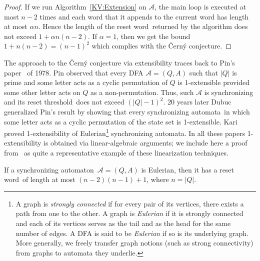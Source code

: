 \documentclass{irmaart}
\newcommand{\sa}{synchronizing au\-tom\-a\-ta}
\newcommand{\san}{synchronizing au\-tom\-a\-ton}
\newcommand{\sw}{reset word}
\newcommand{\rt}{reset threshold}
\theoremstyle{plain}
\begin{document}
\begin{proof}
If we run Algorithm~\ref{KV:Extension} on $\mathcal{A}$, the main loop is
executed at most $n-2$ times and each word that it appends to the current word
has length at most $\alpha n$. Hence the length of the \sw\ returned by the
algorithm does not exceed $1+\alpha n(n-2)$. If $\alpha=1$, then we get the
bound $1+n(n-2)=(n-1)^2$ which complies with the \v{C}ern\'{y} conjecture.
\end{proof}

The approach to the \v{C}ern\'{y} conjecture via extensibility traces back to
Pin's paper~\cite{Pin:1978} of 1978. Pin observed that every DFA
$\mathcal{A}=(Q,A)$ such that $|Q|$ is prime and some letter acts as a cyclic
permutation of $Q$ is 1-extensible provided some other letter acts on $Q$ as a
non-permutation. Thus, such $\mathcal{A}$ is synchronizing and its \rt\ does
not exceed $(|Q|-1)^2$. 20 years later Dubuc~\cite{Dubuc:1998} generalized
Pin's result by showing that every \sa\ in which some letter acts as a cyclic
permutation of the state set is 1-extensible. Kari~\cite{Kari:2003} proved
1-extensibility of Eulerian\footnote{A graph is  \emph{strongly connected} if
for every pair of its vertices, there exists a path from one to the other. A
graph is \emph{Eulerian} if it is strongly connected and each of its vertices
serves as the tail and as the head for the same number of edges. A DFA is said
to be \emph{Eulerian} if so is its underlying graph. More generally, we freely
transfer graph notions (such as strong connectivity) from graphs to automata
they underlie.} \sa. In all these papers 1-extensibility is obtained via
linear-algebraic arguments; we include here a proof from~\cite{Kari:2003} as quite a
representative example of these linearization techniques.

\begin{theorem}
\label{KV:thm:eulerian} If a \san\ $\mathcal{A}=(Q,A)$ is Eulerian, then it has
a \sw\ of length at most $(n-2)(n-1)+1$, where $n=|Q|$.
\end{theorem}
\end{document}
